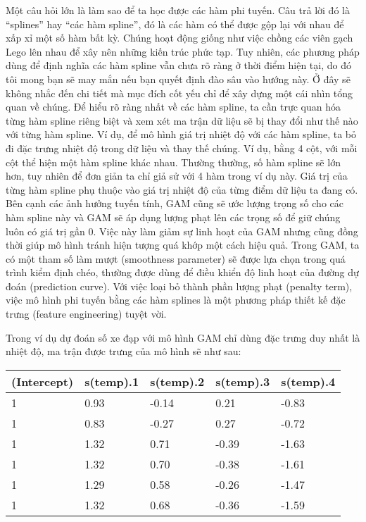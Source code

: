 Một câu hỏi lớn là làm sao để ta học được các hàm phi tuyến. Câu trả lời đó là ``splines'' hay ``các hàm spline'', đó là các hàm có thể được gộp lại với nhau để xấp xỉ một số hàm bất kỳ. Chúng hoạt động giống như việc chồng các viên gạch Lego lên nhau để xây nên những kiến trúc phức tạp. Tuy nhiên, các phương pháp dùng để định nghĩa các hàm spline vẫn chưa rõ ràng ở thời điểm hiện tại, do đó tôi mong bạn sẽ may mắn nếu bạn quyết định đào sâu vào hướng này. Ở đây sẽ không nhắc đến chi tiết mà mục đích cốt yếu chỉ để xây dựng một cái nhìn tổng quan về chúng. Để hiểu rõ ràng nhất về các hàm spline, ta cần trực quan hóa từng hàm spline riêng biệt và xem xét ma trận dữ liệu sẽ bị thay đổi như thế nào với từng hàm spline. Ví dụ, để mô hình giá trị nhiệt độ với các hàm spline, ta bỏ đi đặc trưng nhiệt độ trong dữ liệu và thay thế chúng. Ví dụ, bằng 4 cột, với mỗi cột thể hiện một hàm spline khác nhau. Thường thường, số hàm spline sẽ lớn hơn, tuy nhiên để đơn giản ta chỉ giả sử với 4 hàm trong ví dụ này. Giá trị của từng hàm spline phụ thuộc vào giá trị nhiệt độ của từng điểm dữ liệu ta đang có. Bên cạnh các ảnh hưởng tuyến tính, GAM cũng sẽ ước lượng trọng số cho các hàm spline này và GAM sẽ áp dụng lượng phạt lên các trọng số để giữ chúng luôn có giá trị gần 0. Việc này làm giảm sự linh hoạt của GAM nhưng cũng đồng thời giúp mô hình tránh hiện tượng quá khớp một cách hiệu quả. Trong GAM, ta có một tham số làm mượt (smoothness parameter) sẽ được lựa chọn trong quá trình kiểm định chéo, thường được dùng để điều khiển độ linh hoạt của đường dự đoán (prediction curve). Với việc loại bỏ thành phần lượng phạt (penalty term), việc mô hình phi tuyến bằng các hàm splines là một phương pháp thiết kế đặc trưng (feature engineering) tuyệt vời.

Trong ví dụ dự đoán số xe đạp với mô hình GAM chỉ dùng đặc trưng duy nhất là nhiệt độ, ma trận được trưng của mô hình sẽ như sau:

\begin{table*}[hbt!]
\centering
\begin{tabular}{|l|l|l|l|l|}
\hline
(Intercept) & s(temp).1 & s(temp).2 & s(temp).3 & s(temp).4 \\ \hline
1           & 0.93      & -0.14     & 0.21      & -0.83     \\ \hline
1           & 0.83      & -0.27     & 0.27      & -0.72     \\ \hline
1           & 1.32      & 0.71      & -0.39     & -1.63     \\ \hline
1           & 1.32      & 0.70      & -0.38     & -1.61     \\ \hline
1           & 1.29      & 0.58      & -0.26     & -1.47     \\ \hline
1           & 1.32      & 0.68      & -0.36     & -1.59     \\ \hline
\end{tabular}
\end{table*}

